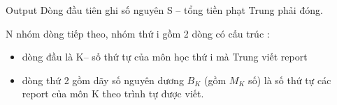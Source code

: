 Output
Dòng đầu tiên ghi số nguyên S – tổng tiền phạt Trung phải đóng.


N nhóm dòng tiếp theo, nhóm thứ i gồm 2 dòng có cấu trúc :
\begin{itemize}
	\item dòng đầu là K– số thứ tự của môn học thứ i mà Trung viết report
	\item dòng thứ 2 gồm dãy số nguyên dương $B_{K}$ (gồm $M_{K}$ số) là số thứ tự các report của môn K theo trình tự được viết.
\end{itemize}